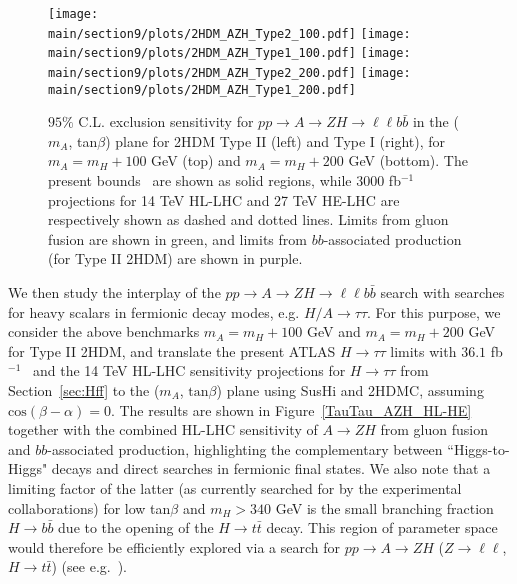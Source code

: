 \begin{figure}[h]
\begin{center}
\texttt{[image: \\main/section9/plots/2HDM\_AZH\_Type2\_100.pdf]}
\hspace{3mm}
\texttt{[image: \\main/section9/plots/2HDM\_AZH\_Type1\_100.pdf]}
\texttt{[image: \\main/section9/plots/2HDM\_AZH\_Type2\_200.pdf]}
\hspace{3mm}
\texttt{[image: \\main/section9/plots/2HDM\_AZH\_Type1\_200.pdf]}
\caption{\small $95\%$ C.L. exclusion sensitivity for $p p \to A \to Z H \to \ell\ell b \bar{b}$  
in the ($m_{A}$, tan$\beta$) plane for 2HDM Type II (left) and Type I (right), for $m_A = m_H +100$ GeV (top) and $m_A = m_H +200$ GeV (bottom). The present bounds~\cite{Aaboud:2018eoy} are shown as solid regions, while
$3000$ fb$^{-1}$ projections for 14 TeV HL-LHC and 27 TeV HE-LHC are respectively shown as dashed and dotted lines. Limits from gluon fusion are shown in green, and limits from $bb$-associated production (for Type II 2HDM) are shown in purple.}
\label{AZH_HL-LHC}
\end{center}
\end{figure}


We then study the interplay of the $p p \to A \to Z H \to \ell\ell b \bar{b}$ search with searches for heavy scalars in fermionic decay modes, e.g. $H/A \to \tau\tau$. For this purpose, we consider 
the above benchmarks $m_A = m_H + 100$ GeV and $m_A = m_H + 200$ GeV for Type II 2HDM, and translate the present ATLAS $H \to \tau\tau$ limits with $36.1$ fb$^{-1}$~\cite{Aaboud:2017sjh} and the 14 TeV HL-LHC sensitivity projections for $H \to \tau\tau$ from Section~\ref{sec:Hff} to the ($m_{A}$, $\mathrm{tan}\beta$) plane using {\sc SusHi} and {\sc 2HDMC}, assuming $\mathrm{cos}(\beta - \alpha) = 0$. The results are shown in Figure~\ref{TauTau_AZH_HL-HE} together with the combined HL-LHC sensitivity of $A \to Z H$ from gluon fusion and $bb$-associated production, highlighting the complementary between ``Higgs-to-Higgs" decays and direct searches in fermionic final states. We also note that a limiting factor of the latter (as currently searched for by the experimental collaborations) for low tan$\beta$ and $m_H > 340$ GeV is the small branching fraction $H \to b \bar{b}$ due to the opening of the $H \to t \bar{t}$ decay. This region of parameter space would therefore be efficiently explored via a search for $p p \to A \to Z H$ ($Z\to \ell\ell$, $H \to t\bar{t}$) (see e.g.~\cite{Dorsch:2016tab,Haisch:2018djm}).

